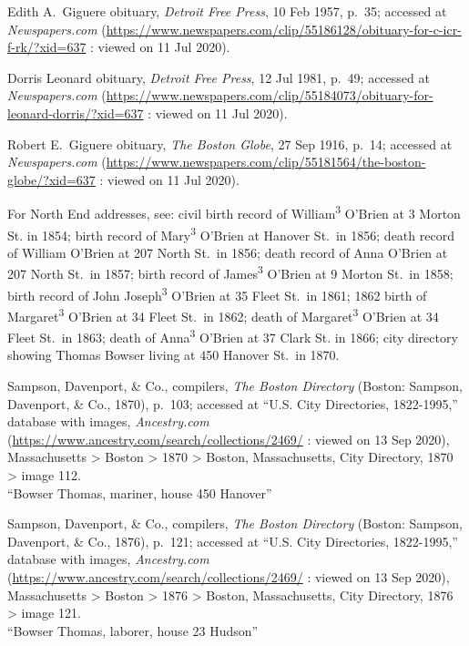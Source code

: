 \begin{thebibliography}{999}
	Edith A.\ Giguere obituary, \textit{Detroit Free Press}, 10 Feb 1957, p.\ 35; accessed at \textit{Newspapers.com} (\url{https://www.newspapers.com/clip/55186128/obituary-for-c-icr-f-rk/?xid=637} : viewed on 11 Jul 2020).
	
	Dorris Leonard obituary, \textit{Detroit Free Press}, 12 Jul 1981, p.\ 49; accessed at \textit{Newspapers.com} (\url{https://www.newspapers.com/clip/55184073/obituary-for-leonard-dorris/?xid=637} : viewed on 11 Jul 2020).
	
	Robert E.\ Giguere obituary, \textit{The Boston Globe}, 27 Sep 1916, p.\ 14; accessed at \textit{Newspapers.com} (\url{https://www.newspapers.com/clip/55181564/the-boston-globe/?xid=637} : viewed on 11 Jul 2020).
	
	For North End addresses, see: civil birth record of William\textsuperscript{3} O'Brien at 3 Morton St. in 1854; birth record of Mary\textsuperscript{3} O'Brien at Hanover St.\ in 1856; death record of William O'Brien at 207 North St.\ in 1856; death record of Anna O'Brien at 207 North St.\ in 1857; birth record of James\textsuperscript{3} O'Brien at 9 Morton St.\ in 1858; birth record of John Joseph\textsuperscript{3} O'Brien at 35 Fleet St.\ in 1861; 1862 birth of Margaret\textsuperscript{3} O'Brien at 34 Fleet St.\ in 1862; death of Margaret\textsuperscript{3}  O'Brien at 34 Fleet St.\ in 1863; death of Anna\textsuperscript{3} O'Brien at 37 Clark St. in 1866; city directory showing Thomas Bowser living at 450 Hanover St.\ in 1870.
	
	Sampson, Davenport, \& Co., compilers, \textit{The Boston Directory} (Boston: Sampson, Davenport, \& Co., 1870), p.\ 103; accessed at ``U.S. City Directories, 1822-1995,'' database with images, \textit{Ancestry.com} (\url{https://www.ancestry.com/search/collections/2469/} : viewed on 13 Sep 2020), Massachusetts > Boston > 1870 > Boston, Massachusetts, City Directory, 1870 > image 112.\\
	``Bowser Thomas, mariner, house 450 Hanover''
	
	Sampson, Davenport, \& Co., compilers, \textit{The Boston Directory} (Boston: Sampson, Davenport, \& Co., 1876), p.\ 121; accessed at ``U.S. City Directories, 1822-1995,'' database with images, \textit{Ancestry.com} (\url{https://www.ancestry.com/search/collections/2469/} : viewed on 13 Sep 2020), Massachusetts > Boston > 1876 > Boston, Massachusetts, City Directory, 1876 > image 121.\\
	``Bowser Thomas, laborer, house 23 Hudson''
	

\end{thebibliography}
